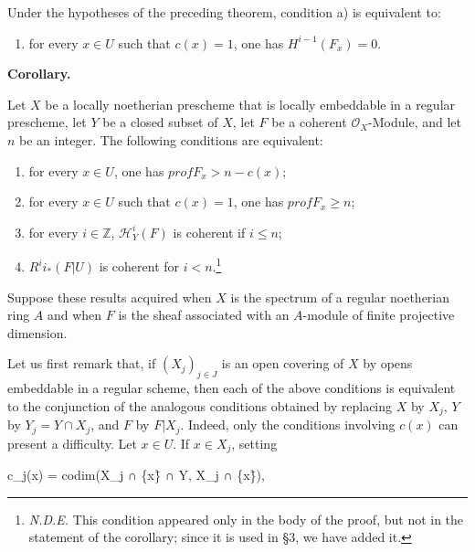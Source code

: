 \documentclass[
  11pt,
  a4paper,
]{book}
\newenvironment{Shaded}{}{}
\newcommand{\NormalTok}[1]{#1}
\providecommand{\tightlist}{%
  \setlength{\itemsep}{0pt}\setlength{\parskip}{0pt}}
\begin{document}
Under the hypotheses of the preceding theorem, condition a) is
equivalent to:

\begin{enumerate}
\def\labelenumi{\alph{enumi})}
\setcounter{enumi}{2}
\tightlist
\item
  for every \(x \in U\) such that \(c(x) = 1\), one has
  \(H^{i-1}(F_{x}) = 0\).
\end{enumerate}

\textbf{Corollary.}

Let \(X\) be a locally noetherian prescheme that is locally embeddable
in a regular prescheme, let \(Y\) be a closed subset of \(X\), let \(F\)
be a coherent \(\mathcal{O}_{X}\)-Module, and let \(n\) be an integer.
The following conditions are equivalent:

\begin{enumerate}
\def\labelenumi{(\roman{enumi})}
\item
  for every \(x \in U\), one has \(prof F_{x} > n - c(x)\);
\item
  for every \(x \in U\) such that \(c(x) = 1\), one has
  \(prof F_{x} \geqslant n\);
\item
  for every \(i \in \mathbb{Z}\), \(\mathcal{H}^{i}_{Y}(F)\) is coherent
  if \(i \leqslant n\);
\item
  \(R^{i} i_{*}(F|U)\) is coherent for \(i < n\).\footnote{\emph{N.D.E.}
    This condition appeared only in the body of the proof, but not in
    the statement of the corollary; since it is used in §3, we have
    added it.}
\end{enumerate}

Suppose these results acquired when \(X\) is the spectrum of a regular
noetherian ring \(A\) and when \(F\) is the sheaf associated with an
\(A\)-module of finite projective dimension.

Let us first remark that, if \((X_{j})_{j \in J}\) is an open covering
of \(X\) by opens embeddable in a regular scheme, then each of the above
conditions is equivalent to the conjunction of the analogous conditions
obtained by replacing \(X\) by \(X_{j}\), \(Y\) by
\(Y_{j} = Y \cap X_{j}\), and \(F\) by \(F|X_{j}\). Indeed, only the
conditions involving \(c(x)\) can present a difficulty. Let \(x \in U\).
If \(x \in X_{j}\), setting

\begin{Shaded}
\begin{Highlighting}[]
\NormalTok{c\_j(x) = codim(X\_j ∩ \{x\}̄ ∩ Y, X\_j ∩ \{x\}̄),}
\end{Highlighting}
\end{Shaded}
\end{document}
